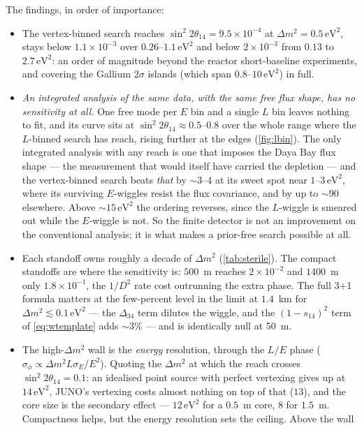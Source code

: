\documentclass[aps,prd,superscriptaddress,nofootinbib,longbibliography,notitlepage,11pt]{revtex4-2}
\newcommand{\dm}[1]{\Delta m^2_{#1}}
\newcommand{\st}[1]{\sin^2 2\theta_{#1}}
\begin{document}
The findings, in order of importance:
\begin{itemize}\itemsep2pt
\item The vertex-binned search reaches $\st{14}=9.5\times10^{-4}$ at
$\dm{}=0.5\,\mathrm{eV^2}$, stays below $1.1\times10^{-3}$ over
$0.26$--$1.1\,\mathrm{eV^2}$ and below $2\times10^{-3}$ from $0.13$ to
$2.7\,\mathrm{eV^2}$: an order of magnitude beyond
the reactor short-baseline experiments, and covering the Gallium $2\sigma$ islands (which
span $0.8$--$10\,\mathrm{eV^2}$) in full.
\item \emph{An integrated analysis of the same data, with the same free flux shape, has no
sensitivity at all.}  One free mode per $E$ bin and a single $L$ bin leaves nothing to fit,
and its curve sits at $\st{14}\approx0.5$--$0.8$ over the whole range where the
$L$-binned search has reach, rising further at the edges (\cref{fig:lbin}).  The only integrated analysis with any reach is one that imposes the
Daya Bay flux shape --- the measurement that would itself have carried the depletion --- and
the vertex-binned search beats \emph{that} by $\sim3$--$4$ at its sweet spot near
$1$--$3\,\mathrm{eV^2}$, where its surviving $E$-wiggles resist the flux covariance, and by
up to $\sim90$ elsewhere.  Above $\sim15\,\mathrm{eV^2}$ the ordering reverses, since the
$L$-wiggle is smeared out while the $E$-wiggle is not.  So the finite detector is not an
improvement on the conventional analysis; it is what makes a prior-free search possible at
all.
\item Each standoff owns roughly a decade of $\dm{}$ (\cref{tab:sterile}).  The compact
standoffs are where the sensitivity is: $500$~m reaches $2\times10^{-2}$ and $1400$~m only
$1.8\times10^{-1}$, the $1/D^2$ rate cost outrunning the extra phase.  The full 3+1
formula matters at the few-percent level in the limit at $1.4$~km for
$\dm{}\lesssim0.1\,\mathrm{eV^2}$ --- the $\Delta_{34}$ term dilutes the wiggle, and the
$(1-s_{14})^2$ term of \cref{eq:wtemplate} adds $\sim3\%$ --- and is identically null at
50~m.
\item The high-$\dm{}$ wall is the \emph{energy} resolution, through the $L/E$ phase
($\sigma_\phi\propto\dm{}L\sigma_E/E^2$).  Quoting the $\dm{}$ at which the reach crosses
$\st{14}=0.1$: an idealised point source with perfect vertexing gives up at
$14\,\mathrm{eV^2}$, JUNO's vertexing costs almost nothing on top of that ($13$), and the
core size is the secondary effect --- $12\,\mathrm{eV^2}$ for a $0.5$~m core, $8$ for
$1.5$~m.  Compactness helps, but the energy resolution sets the ceiling.  Above the wall

\end{itemize}
\end{document}
